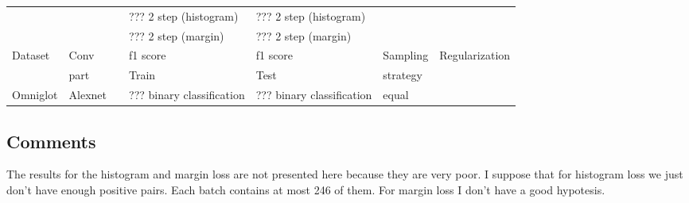 \documentclass[10pt,a4paper]{article}
\begin{document}
\begin{table}[h!]
\begin{tabular}{|l|l|l|l|l|l|l|}
            & & & ??? 2 step (histogram)      & ??? 2 step (histogram)      & &                      \\
            & & & ??? 2 step (margin)         & ??? 2 step (margin)         & &                      \\ \hline \hline
            Dataset & Conv & & f1 score & f1 score & Sampling & Regularization       \\
            & part & & Train & Test & strategy &                      \\ \hline
            Omniglot & Alexnet & & ??? binary classification & ??? binary classification & equal &                      \\
            \hline
        \end{tabular}
    \end{table}

    \subsection{Comments}\label{subsec:comments}

    The results for the histogram and margin loss are not presented here because they are very poor.
    I suppose that for histogram loss we just don't have enough positive pairs. Each batch contains at most 246 of them.
    For margin loss I don't have a good hypotesis.
    \newline
\end{document}
